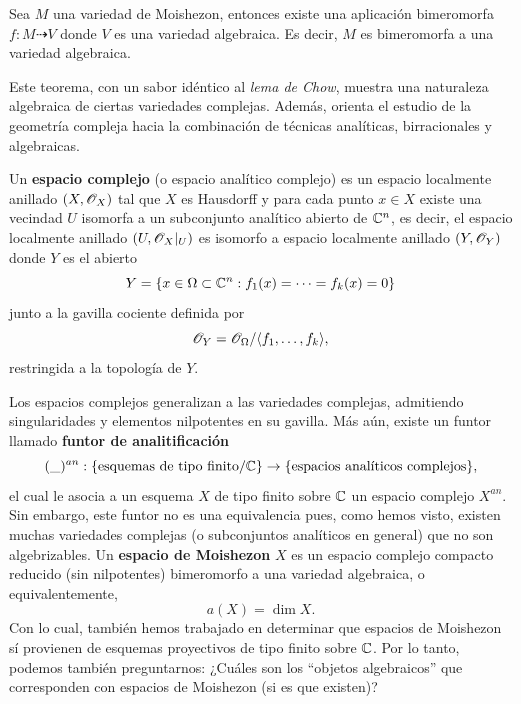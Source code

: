 \begin{theorem}[de Moishezon]\parencite{Moishezonlemmachow}
	Sea $M$ una variedad de Moishezon, entonces existe una aplicación bimeromorfa $f:M\dashrightarrow V$ donde $V$ es una variedad algebraica. Es decir, $M$ es bimeromorfa a una variedad algebraica.
\end{theorem}

Este teorema, con un sabor idéntico al \textit{lema de Chow}, muestra una naturaleza algebraica de ciertas variedades complejas. Además, orienta el estudio de la geometría compleja hacia la combinación de técnicas analíticas, birracionales y algebraicas. 

\begin{remark}\parencite[Chap. VII, Sec. 6.4]{grauertremment}\label{espaciosdemoishezon}
	Un \textbf{espacio complejo} (o espacio analítico complejo) es un espacio localmente anillado $(X,\mathscr{O}_X)$ tal que $X$ es Hausdorff y para cada punto $x\in X$ existe una vecindad $U$ isomorfa a un subconjunto analítico abierto de $\mathbb{C}^n$, es decir, el espacio localmente anillado $(U,\mathscr{O}_X|_U)$ es isomorfo a espacio localmente anillado $(Y,\mathscr{O}_Y)$ donde $Y$ es el abierto
	\begin{equation*}
		Y=\{x\in \Omega\subset\mathbb{C}^n:f_1(x)=\cdots=f_k(x)=0\}
	\end{equation*}
	junto a la gavilla cociente definida por
	\begin{equation*}
		\mathscr{O}_Y=\mathscr{O}_\Omega/\langle f_1,\dots, f_k\rangle,
	\end{equation*}
	restringida a la topología de $Y$.
	
	Los espacios complejos generalizan a las variedades complejas, admitiendo singularidades y elementos nilpotentes en su gavilla. Más aún, existe un funtor llamado \textbf{funtor de analitificación}
	\begin{equation*}
		(\_)^{an}:\{\text{esquemas de tipo finito}/\mathbb{C}\}\to\{\text{espacios analíticos complejos}\},
	\end{equation*}
	el cual le asocia a un esquema $X$ de tipo finito sobre $\mathbb{C}$ un espacio complejo $X^{an}$. Sin embargo, este funtor no es una equivalencia pues, como hemos visto, existen muchas variedades complejas (o subconjuntos analíticos en general) que no son algebrizables. Un \textbf{espacio de Moishezon} $X$ es un espacio complejo compacto reducido (sin nilpotentes) bimeromorfo a una variedad algebraica, o equivalentemente,
	\begin{equation*}
		a(X)=\dim X.
	\end{equation*}
	Con lo cual, también hemos trabajado en determinar que espacios de Moishezon sí provienen de esquemas proyectivos de tipo finito sobre $\mathbb{C}$. Por lo tanto, podemos también preguntarnos: ¿Cuáles son los \enquote{objetos algebraicos} que corresponden con espacios de Moishezon (si es que existen)?
	\end{remark}

